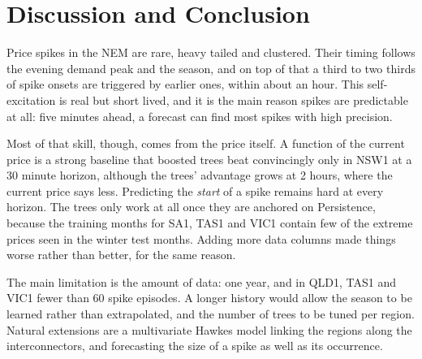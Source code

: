 \chapter{Discussion and Conclusion}\label{ch:conclusion}

Price spikes in the NEM are rare, heavy tailed and clustered. Their timing follows the evening demand peak and the season, and on top of that a third to two thirds of spike onsets are triggered by earlier ones, within about an hour. This self-excitation is real but short lived, and it is the main reason spikes are predictable at all: five minutes ahead, a forecast can find most spikes with high precision.

Most of that skill, though, comes from the price itself. A function of the current price is a strong baseline that boosted trees beat convincingly only in NSW1 at a 30 minute horizon, although the trees' advantage grows at 2 hours, where the current price says less. Predicting the \emph{start} of a spike remains hard at every horizon. The trees only work at all once they are anchored on Persistence, because the training months for SA1, TAS1 and VIC1 contain few of the extreme prices seen in the winter test months. Adding more data columns made things worse rather than better, for the same reason.

The main limitation is the amount of data: one year, and in QLD1, TAS1 and VIC1 fewer than 60 spike episodes. A longer history would allow the season to be learned rather than extrapolated, and the number of trees to be tuned per region. Natural extensions are a multivariate Hawkes model linking the regions along the interconnectors, and forecasting the size of a spike as well as its occurrence.